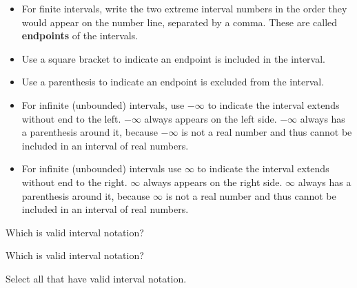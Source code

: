 \documentclass{ximera}
\begin{document}
\begin{itemize}
\item For finite intervals, write the two extreme interval numbers in the order they would appear on the number line, separated by a comma.  These are called \textbf{endpoints} of the intervals.
\item Use a square bracket to indicate an endpoint is included in the interval.
\item Use a parenthesis to indicate an endpoint is excluded from the interval.
\item For infinite (unbounded) intervals, use $-\infty$ to indicate the interval extends without end to the left. $-\infty$ always appears on the left side. $-\infty$ always has a parenthesis around it, because $-\infty$ is not a real number and thus cannot be included in an interval of real numbers.
\item For infinite (unbounded) intervals use $\infty$ to indicate the interval extends without end to the right. $\infty$ always appears on the right side. $\infty$ always has a parenthesis around it, because $\infty$ is not a real number and thus cannot be included in an interval of real numbers. 
\end{itemize}


\begin{question}

Which is valid interval notation?
	\begin{multipleChoice}
	\choice {$[3, -2)$}
	\choice [correct]{$[-2, 3)$}
	\end{multipleChoice}
\end{question}



\begin{question}

Which is valid interval notation?
	\begin{multipleChoice}
	\choice {$[1, \infty]$}
	\choice [correct]{$[1, \infty)$}
	\end{multipleChoice}
\end{question}



\begin{question}

Select all that have valid interval notation.
	\begin{selectAll}
	\choice {$[-3, -5]$}
	\choice [correct]{$[1, 8)$}
	\choice [correct]{$(-\infty, -4]$}
	\choice {$[-\infty, 7)$}
	\choice [correct]{$(-1, 2]$}
	\choice {$[6, 2]$}
	\end{selectAll}
\end{question}
\end{document}
